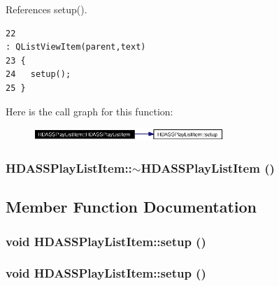References setup().



\footnotesize\begin{verbatim}22                                                                                : QListViewItem(parent,text)
23 {
24   setup();
25 }
\end{verbatim}\normalsize 


Here is the call graph for this function:\begin{figure}[H]
\begin{center}
\leavevmode
\includegraphics[width=204pt]{classHDASSPlayListItem_HDASSPlayListItema3_cgraph}
\end{center}
\end{figure}
\subsubsection{\setlength{\rightskip}{0pt plus 5cm}HDASSPlay\-List\-Item::$\sim${\bf HDASSPlay\-List\-Item} ()}\label{classHDASSPlayListItem_HDASSPlayListItema4}




\subsection{Member Function Documentation}
\subsubsection{\setlength{\rightskip}{0pt plus 5cm}void HDASSPlay\-List\-Item::setup ()}\label{classHDASSPlayListItem_HDASSPlayListItema5}


\subsubsection{\setlength{\rightskip}{0pt plus 5cm}void HDASSPlay\-List\-Item::setup ()}\label{classHDASSPlayListItem_HDASSPlayListItema2}





